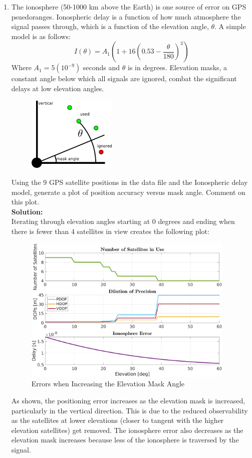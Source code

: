 \documentclass[11pt]{article}
\newcommand{\solution}{\textbf{Solution: \\}}
\begin{document}
\begin{enumerate}[label=\textbf{\arabic*.}]
  \item The ionosphere (50-1000 km above the Earth) is one source of error on GPS 
  psuedoranges. Ionospheric delay is a function of how much atmosphere the signal 
  passes through, which is a function of the elevation angle, $\theta$. A simple 
  model is as follows:
  \begin{equation*}
    I(\theta) = A_1(1+16(0.53-\dfrac{\theta}{180})^3)
  \end{equation*}
  Where $A_1 = 5(10^{-9})$ seconds and $\theta$ is in degrees. Elevation masks, 
  a constant angle below which all signals are ignored, combat the significant 
  delays at low elevation angles.
  \begin{figure}[H]
    \centering
    \includegraphics[width=0.4\textwidth]{q5.png}
  \end{figure}
  Using the 9 GPS satellite positions in the data file and the Ionospheric 
  delay model, generate a plot of position accuracy versus mask angle. Comment 
  on this plot. \\
  \solution
  Iterating through elevation angles starting at 0 degrees and ending when there 
  is fewer than 4 satellites in view creates the following plot:
  \begin{figure}[H]
    \centering
    \includegraphics[width=0.95\textwidth]{p5.png}
    \caption{Errors when Increasing the Elevation Mask Angle}
  \end{figure}
  As shown, the positioning error increases as the elevation mask is increased, 
  particularly in the vertical direction. This is due to the reduced observability 
  as the satellites at lower elevations (closer to tangent with the higher 
  elevation satellites) get removed. The ionosphere error also decreases as the 
  elevation mask increases because less of the ionosphere is traversed by the 
  signal.
  
\end{enumerate}
\end{document}
